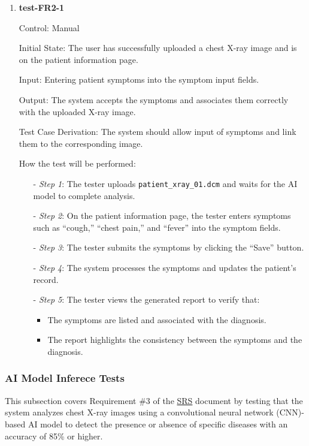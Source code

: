 \documentclass[12pt, titlepage]{article}
\begin{document}
\begin{enumerate}

\item \textbf{test-FR2-1} \label{test-FR2-1}

Control: Manual

Initial State: The user has successfully uploaded a chest X-ray image and is on the patient information page.

Input: Entering patient symptoms into the symptom input fields.

Output: The system accepts the symptoms and associates them correctly with the uploaded X-ray image.

Test Case Derivation: The system should allow input of symptoms and link them to the corresponding image.

How the test will be performed: 
\begin{itemize}
  \item[-] \textit{Step 1}: The tester uploads \texttt{patient\_xray\_01.dcm} and waits for the AI model to complete analysis.
  \item[-] \textit{Step 2}: On the patient information page, the tester enters symptoms such as  ``cough,'' ``chest pain,'' and ``fever'' into the symptom fields.
  \item[-] \textit{Step 3}: The tester submits the symptoms by clicking the ``Save'' button.
  \item[-] \textit{Step 4}: The system processes the symptoms and updates the patient's record.
  \item[-] \textit{Step 5}: The tester views the generated report to verify that:
    \begin{itemize}
      \item The symptoms are listed and associated with the diagnosis.
      \item The report highlights the consistency between the symptoms and the diagnosis.
    \end{itemize}
  \end{itemize}

\end{enumerate}

\subsubsection{AI Model Inferece Tests}

This subsection covers Requirement \#3 of the \href{https://github.com/RezaJodeiri/CXR-Capstone/blob/main/docs/SRS/SRS.pdf}{SRS} \citep{SRS}
document by testing that the system analyzes chest X-ray images using a convolutional neural network (CNN)-based AI model to detect the presence or absence of specific diseases with an accuracy of 85\% or higher.
\end{document}
